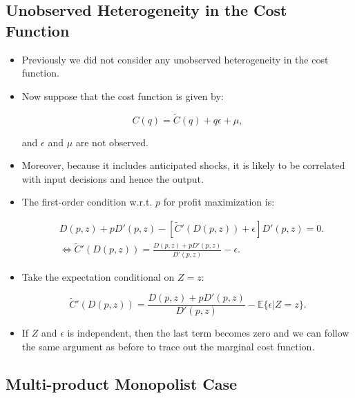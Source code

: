 \documentclass[]{book}
\theoremstyle{definition}
\theoremstyle{definition}
\theoremstyle{definition}
\theoremstyle{remark}
\begin{document}
\subsection{Unobserved Heterogeneity in the Cost
Function}\label{unobserved-heterogeneity-in-the-cost-function}

\begin{itemize}
\item
  Previously we did not consider any unobserved heterogeneity in the
  cost function.
\item
  Now suppose that the cost function is given by:

  \begin{equation}
  C(q) = \tilde{C}(q) + q \epsilon + \mu,
  \end{equation}

  and \(\epsilon\) and \(\mu\) are not observed.
\item
  Moreover, because it includes anticipated shocks, it is likely to be
  correlated with input decisions and hence the output.
\item
  The first-order condition w.r.t. \(p\) for profit maximization is:

  \begin{equation}
  \begin{split}
  &D(p, z) + pD'(p, z) - [\tilde{C}'(D(p, z)) + \epsilon]D'(p, z) = 0.\\
  &\Leftrightarrow \tilde{C}'(D(p, z))  = \frac{D(p, z) + pD'(p, z)}{D'(p,z)} - \epsilon.
  \end{split}
  \end{equation}
\item
  Take the expectation conditional on \(Z = z\):

  \begin{equation}
  \tilde{C}'(D(p, z)) = \frac{D(p, z) + pD'(p, z)}{D'(p, z)} - \mathbb{E}\{\epsilon|Z = z\}.
  \end{equation}
\item
  If \(Z\) and \(\epsilon\) is independent, then the last term becomes
  zero and we can follow the same argument as before to trace out the
  marginal cost function.
\end{itemize}

\subsection{Multi-product Monopolist
Case}\label{multi-product-monopolist-case}
\end{document}
